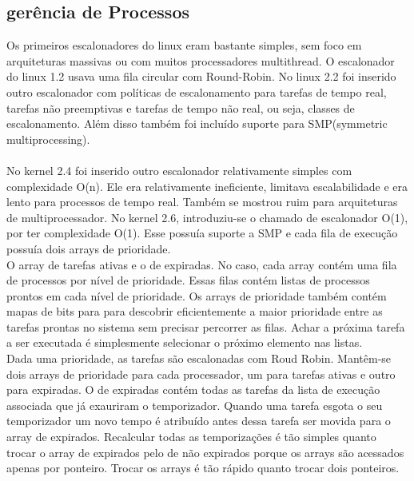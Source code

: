 \documentclass[conference]{IEEEtran}
\begin{document}
\subsection{gerência de Processos}\label{sec:LinuxPROC}

Os primeiros escalonadores do linux eram bastante simples, sem foco em arquiteturas massivas ou com muitos processadores multithread. O escalonador do linux 1.2 usava uma fila circular com Round-Robin. No linux 2.2 foi inserido outro escalonador com políticas de escalonamento para tarefas de tempo real, tarefas não preemptivas e tarefas de tempo não real, ou seja,  classes de escalonamento. Além disso também foi incluído suporte para SMP(symmetric multiprocessing)\cite{LinuxSchedulerIBM}.\\
\\
 No kernel 2.4 foi  inserido outro escalonador relativamente simples com complexidade O(n). Ele era relativamente ineficiente, limitava escalabilidade e era lento para processos de tempo real. Também se mostrou ruim para arquiteturas de multiprocessador. No kernel 2.6, introduziu-se o chamado de escalonador O(1), por ter complexidade O(1). Esse possuía suporte a SMP e cada fila de execução possuía dois arrays de prioridade.\\

 O array de tarefas ativas e o de expiradas. No caso, cada array contém uma fila de processos por nível de prioridade. Essas filas contém listas de processos prontos em cada nível de prioridade. Os  arrays de prioridade também contém mapas de bits para para descobrir eficientemente a maior prioridade entre as tarefas prontas no sistema sem precisar percorrer as filas. Achar a próxima tarefa a ser executada é simplesmente selecionar o próximo elemento nas listas.\\

 Dada uma prioridade, as tarefas são escalonadas com Roud Robin. Mantêm-se dois arrays de prioridade para cada processador, um para tarefas ativas e outro para expiradas. O de expiradas contém todas as tarefas da lista de execução associada que já exauriram o temporizador. Quando uma tarefa esgota o seu temporizador um novo tempo é atribuído antes dessa tarefa ser movida para o array de expirados. Recalcular todas as temporizações é tão simples quanto trocar o array de expirados pelo de não expirados porque os arrays são acessados apenas por ponteiro. Trocar os arrays é tão rápido quanto trocar dois ponteiros\cite{LinuxSchedulerMIT}.\\
\end{document}
